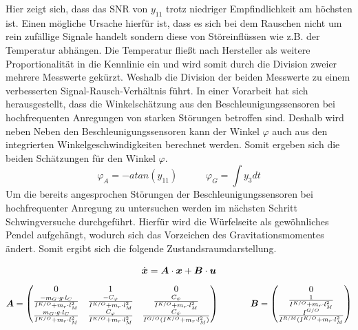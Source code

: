 Hier zeigt sich, dass das SNR von $y_{11}$ trotz niedriger Empfindlichkeit am höchsten ist. Einen mögliche Ursache hierfür ist, dass es sich bei dem Rauschen nicht um rein zufällige Signale handelt sondern diese von Störeinflüssen wie z.B. der Temperatur abhängen. Die Temperatur fließt nach Hersteller als weitere Proportionalität in die Kennlinie ein und wird somit durch die Division zweier mehrere Messwerte gekürzt. Weshalb die Division der beiden Messwerte zu einem verbesserten Signal-Rausch-Verhältnis führt.
In einer Vorarbeit hat sich herausgestellt, dass die Winkelschätzung aus den Beschleunigungssensoren bei hochfrequenten Anregungen von starken Störungen betroffen sind. Deshalb wird neben 
Neben den Beschleunigungssensoren kann der Winkel $\varphi$ auch aus den integrierten Winkelgeschwindigkeiten berechnet werden. Somit ergeben sich die beiden Schätzungen für den Winkel $\varphi$.
\begin{equation}
\varphi_A = -atan(y_{11}) \hspace{35pt} \varphi_G = \int y_3 dt
\end{equation}
Um die bereits angesprochen Störungen der Beschleunigungssensoren bei hochfrequenter Anregung zu untersuchen werden im nächsten Schritt Schwingversuche durchgeführt. Hierfür wird die Würfelseite als gewöhnliches Pendel aufgehängt, wodurch sich das Vorzeichen des Gravitationsmomentes ändert. Somit ergibt sich die folgende Zustandsraumdarstellung.

\begin{equation}
\dot{\boldsymbol{x}}=\boldsymbol{A}\cdot \boldsymbol{x}+\boldsymbol{B}\cdot \boldsymbol{u}
\end{equation}
\begin{equation}
\boldsymbol{A} = \begin{pmatrix}
 0 & 1 & 0 \\
 \frac{-m_G\cdot g\cdot l_C}{I^{K/O}+m_r\cdot l^2_M} & 
 \frac{-C_{\varphi}}{I^{K/O}+m_r\cdot l^2_M} &
 \frac{C_{\psi}}{I^{K/O}+m_r\cdot l^2_M} \\
 \frac{m_G\cdot g \cdot l_C}{I^{K/O}+m_r\cdot l^2_M} &
 \frac{C_{\varphi}}{I^{K/O}+m_r\cdot l^2_M} &
 \frac{C_{\psi}}{I^{G/O}(I^{K/O}+m_r\cdot l^2_M)}
\end{pmatrix}
\hspace{35pt}
\boldsymbol{B} = \begin{pmatrix}
0 \\ \frac{1}{I^{K/O}+m_r\cdot l^2_M} \\ \frac{I^{G/O}}{I^{R/M}(I^{K/O}+m_r \cdot l^2_M}
\end{pmatrix}
\end{equation}

